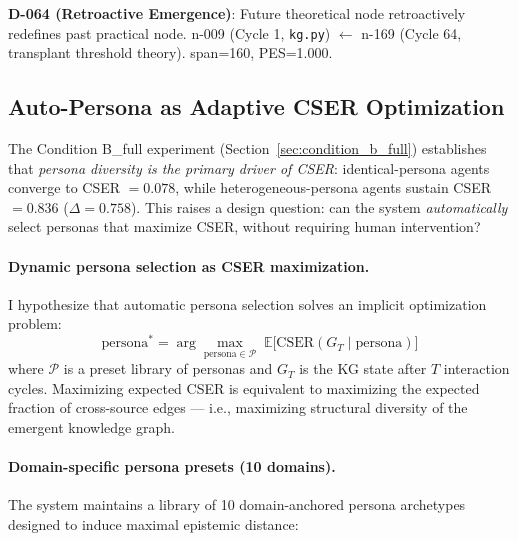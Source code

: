 \documentclass[12pt]{article}
\begin{document}
\textbf{D-064 (Retroactive Emergence)}: Future theoretical node retroactively redefines
past practical node. n-009 (Cycle 1, \texttt{kg.py}) $\leftarrow$ n-169 (Cycle 64,
transplant threshold theory). span=160, PES=1.000.

\subsection{Auto-Persona as Adaptive CSER Optimization}
\label{sec:auto_persona_cser}

The Condition B\_full experiment (Section~\ref{sec:condition_b_full}) establishes
that \emph{persona diversity is the primary driver of CSER}: identical-persona agents
converge to CSER $= 0.078$, while heterogeneous-persona agents sustain CSER $= 0.836$
($\Delta = 0.758$). This raises a design question: can the system \emph{automatically}
select personas that maximize CSER, without requiring human intervention?

\paragraph{Dynamic persona selection as CSER maximization.}
I hypothesize that automatic persona selection solves an implicit optimization problem:
\[
  \text{persona}^* = \arg\max_{\text{persona} \in \mathcal{P}}
    \;\mathbb{E}\bigl[\text{CSER}(G_T \mid \text{persona})\bigr]
\]
where $\mathcal{P}$ is a preset library of personas and $G_T$ is the KG state after
$T$ interaction cycles. Maximizing expected CSER is equivalent to maximizing the
expected fraction of cross-source edges --- i.e., maximizing structural diversity
of the emergent knowledge graph.

\paragraph{Domain-specific persona presets (10 domains).}
The system maintains a library of 10 domain-anchored persona archetypes designed
to induce maximal epistemic distance:
\end{document}

